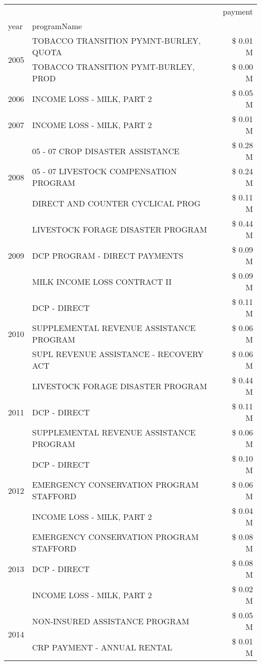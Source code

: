 \begin{tabular}{llr}
\toprule
 &  & payment \\
year & programName &  \\
\midrule
\multirow[t]{2}{*}{2005} & TOBACCO TRANSITION PYMNT-BURLEY, QUOTA & \$ 0.01 M \\
 & TOBACCO TRANSITION PYMT-BURLEY, PROD & \$ 0.00 M \\
\cline{1-3}
2006 & INCOME LOSS - MILK, PART 2 & \$ 0.05 M \\
\cline{1-3}
2007 & INCOME LOSS - MILK, PART 2 & \$ 0.01 M \\
\cline{1-3}
\multirow[t]{3}{*}{2008} & 05 - 07 CROP DISASTER ASSISTANCE & \$ 0.28 M \\
 & 05 - 07 LIVESTOCK COMPENSATION PROGRAM & \$ 0.24 M \\
 & DIRECT AND COUNTER CYCLICAL PROG & \$ 0.11 M \\
\cline{1-3}
\multirow[t]{3}{*}{2009} & LIVESTOCK FORAGE DISASTER  PROGRAM & \$ 0.44 M \\
 & DCP PROGRAM - DIRECT PAYMENTS & \$ 0.09 M \\
 & MILK INCOME LOSS CONTRACT II & \$ 0.09 M \\
\cline{1-3}
\multirow[t]{3}{*}{2010} & DCP - DIRECT & \$ 0.11 M \\
 & SUPPLEMENTAL REVENUE ASSISTANCE PROGRAM & \$ 0.06 M \\
 & SUPL REVENUE ASSISTANCE - RECOVERY ACT & \$ 0.06 M \\
\cline{1-3}
\multirow[t]{3}{*}{2011} & LIVESTOCK FORAGE DISASTER PROGRAM & \$ 0.44 M \\
 & DCP - DIRECT & \$ 0.11 M \\
 & SUPPLEMENTAL REVENUE ASSISTANCE PROGRAM & \$ 0.06 M \\
\cline{1-3}
\multirow[t]{3}{*}{2012} & DCP - DIRECT & \$ 0.10 M \\
 & EMERGENCY CONSERVATION PROGRAM STAFFORD & \$ 0.06 M \\
 & INCOME LOSS - MILK, PART 2 & \$ 0.04 M \\
\cline{1-3}
\multirow[t]{3}{*}{2013} & EMERGENCY CONSERVATION PROGRAM STAFFORD & \$ 0.08 M \\
 & DCP - DIRECT & \$ 0.08 M \\
 & INCOME LOSS - MILK, PART 2 & \$ 0.02 M \\
\cline{1-3}
\multirow[t]{3}{*}{2014} & NON-INSURED ASSISTANCE PROGRAM & \$ 0.05 M \\
 & CRP PAYMENT - ANNUAL RENTAL & \$ 0.01 M \\

\end{tabular}
